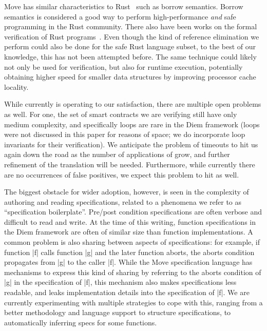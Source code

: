 Move has similar characteristics to Rust~\cite{rust} such as borrow semantics. Borrow semantics is considered a good way to perform high-performance \emph{and} safe programming in the Rust community. There also have been works on the formal verification of Rust programs~\cite{prusti,smack,nopanic,crust}.
Even though the kind of reference
elimination we perform could also be done for the safe Rust language subset, to
the best of our knowledge, this has not been attempted before. The same
technique could likely not only be used for verification, but also for runtime
execution, potentially obtaining higher speed for smaller data structures by
improving processor cache locality.


While currently \MVP is operating to our satisfaction, there are multiple open
problems as well. For one, the set of smart contracts we are verifying still
have only medium complexity, and specifically loops are rare in the Diem
framework (loops were not discussed in this paper for reasons of space; we do
incorporate loop invariants for their verification). We anticipate the problem
of timeouts to hit us again down the road as the number of applications of \MVP
grow, and further refinement of the translation will be needed. Furthermore,
while currently there are no occurrences of false positives, we expect this problem
to hit as well.

The biggest obstacle for wider adoption, however, is seen in the complexity of
authoring and reading specifications, related to a phenomena we refer to as
``specification boilerplate''. Pre/post condition specifications are often
verbose and difficult to read and write. At the time of this writing, function
specifications in the Diem framework are often of similar size than function
implementations.  A common problem is also sharing between aspects of specifications:
for example, if function |f| calls function |g| and the later function aborts, the
aborts condition propagates from |g| to the caller |f|. While the Move specification
language has mechanisms to express this kind of sharing by referring to the aborts
condition of |g| in the specification of |f|, this mechanism also makes specifications
less readable, and leaks implementation details into the specification of |f|.
We are currently experimenting with multiple strategies to cope with this, ranging
from a better methodology and language support to structure specifications, to
automatically inferring specs for some functions.



